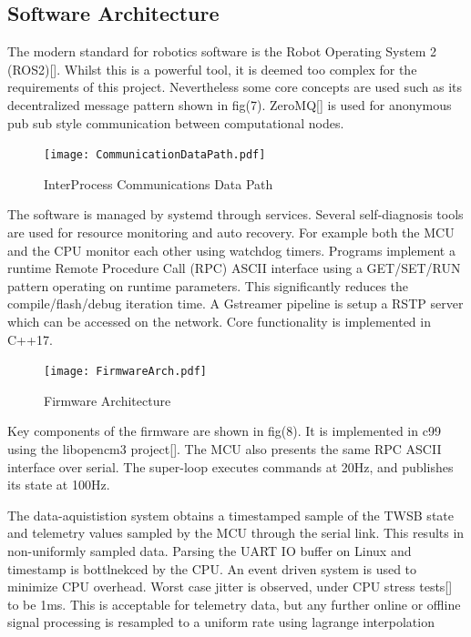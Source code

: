       
        \pagebreak{}
        \subsection{Software Architecture}
        The modern standard for robotics software is the Robot Operating System 2 (ROS2)[]. 
        Whilst this is a powerful tool, it is deemed too complex for the requirements of this project.
        Nevertheless some core concepts are used such as its 
        decentralized message pattern shown in fig(7). ZeroMQ[] is used for 
        anonymous pub sub style communication between computational nodes.
        \begin{figure} [H]
            \texttt{[image: CommunicationDataPath.pdf]}  
            \caption{InterProcess Communications Data Path}
        \end{figure}

        The software is managed by systemd through services. 
        Several self-diagnosis tools are used for resource monitoring and auto recovery. 
        For example both the MCU and the CPU monitor each other using watchdog timers.
        Programs implement a runtime Remote Procedure Call (RPC) ASCII interface using 
        a GET/SET/RUN pattern operating on runtime parameters. This significantly reduces the compile/flash/debug 
        iteration time. A Gstreamer pipeline is setup a RSTP server which can be accessed on the network.
        Core functionality is implemented in C++17. 
        \begin{figure} [H]
            \texttt{[image: FirmwareArch.pdf]}
            \caption{Firmware Architecture}
        \end{figure}
        Key components of the firmware are shown in fig(8).
        It is implemented in c99 using the libopencm3 project[]. 
        The MCU also presents the same RPC ASCII interface over serial.
        The super-loop executes commands at 20Hz, 
        and publishes its state at 100Hz.

        The data-aquististion system obtains a timestamped sample of the TWSB state 
        and telemetry values sampled by the MCU through the serial link.
        This results in non-uniformly sampled data. Parsing the UART IO buffer on Linux 
        and timestamp is bottlnekced by the CPU. An event driven system is used to minimize CPU overhead.   
        Worst case jitter is observed, under CPU stress tests[] to be 1ms. This is acceptable for telemetry data, but
        any further online or offline signal processing is resampled to a uniform rate using lagrange interpolation \cite{DataStreamProcessing.}
        \pagebreak{}
